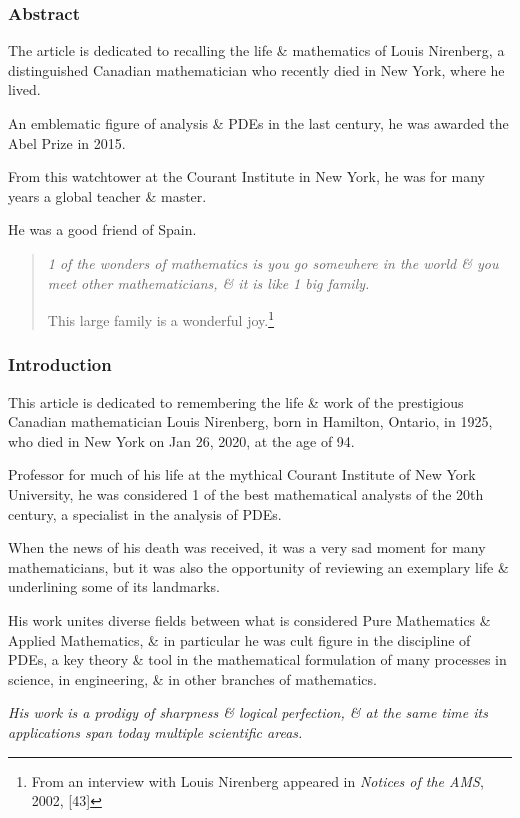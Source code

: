 \documentclass{article}
\begin{document}
\subsubsection*{Abstract}
The article is dedicated to recalling the life \& mathematics of Louis Nirenberg, a distinguished Canadian mathematician who recently died in New York, where he lived.

An emblematic figure of analysis \& PDEs in the last century, he was awarded the Abel Prize in 2015.

From this watchtower at the Courant Institute in New York, he was for many years a global teacher \& master.

He was a good friend of Spain.
\begin{quotation}\it
	1 of the wonders of mathematics is you go somewhere in the world \& you meet other mathematicians, \& it is like 1 big family.
	
	This large family is a wonderful joy.\footnote{From an interview with Louis Nirenberg appeared in \textit{Notices of the AMS}, 2002, [43]}
\end{quotation}

\subsubsection{Introduction}
This article is dedicated to remembering the life \& work of the prestigious Canadian mathematician Louis Nirenberg, born in Hamilton, Ontario, in 1925, who died in New York on Jan 26, 2020, at the age of 94.

Professor for much of his life at the mythical Courant Institute of New York University, he was considered 1 of the best mathematical analysts of the 20th century, a specialist in the analysis of PDEs.

%
When the news of his death was received, it was a very sad moment for many mathematicians, but it was also the opportunity of reviewing an exemplary life \& underlining some of its landmarks.

His work unites diverse fields between what is considered Pure Mathematics \& Applied Mathematics, \& in particular he was cult figure in the discipline of PDEs, a key theory \& tool in the mathematical formulation of many processes in science, in engineering, \& in other branches of mathematics.

\textit{His work is a prodigy of sharpness \& logical perfection, \& at the same time its applications span today multiple scientific areas.}
\end{document}
